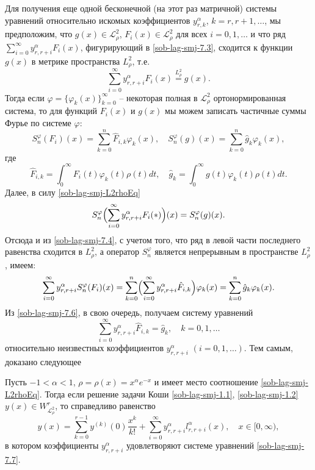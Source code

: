 Для получения еще одной бесконечной (на этот раз матричной) системы уравнений относительно искомых коэффициентов $y^\alpha_{r,k}$, $k=r,r+1,\ldots$, мы предположим, что $g(x)\in \mathcal{L}^2_\rho$, $F_i(x)\in \mathcal{L}^2_\rho$ для всех $i=0,1,\ldots$ и что ряд $\sum_{i=0}^\infty y^\alpha_{r,r+i}F_i(x)$, фигурирующий в \eqref{sob-lag-smj-7.3}, сходится к функции $g(x)$ в метрике пространства $L^2_\rho$, т.е.
\begin{equation}\label{sob-lag-smj-L2rhoEq}
\sum_{i=0}^\infty y^\alpha_{r,r+i}F_i(x) \stackrel{L^2_\rho}{=} g(x).
\end{equation}
Тогда если $\varphi = \{\varphi_k(x)\}_{k=0}^\infty$ -- некоторая полная в $\mathcal{L}^2_\rho$ ортонормированная система, то для функций $F_i(x)$ и $g(x)$ мы можем записать частичные суммы Фурье по системе $\varphi$:
\begin{equation}\label{sob-lag-smj-7.4}
S_n^\varphi(F_i)(x)= \sum_{k=0}^n\hat F_{i,k}\varphi_k(x), \quad
S_n^\varphi(g)(x)= \sum_{k=0}^n\hat g_{k}\varphi_k(x),
\end{equation}
где
$$
\hat F_{i,k}= \int_{0}^\infty F_{i}(t)\varphi_k(t)\rho(t)dt, \quad
\hat g_{k}= \int_{0}^\infty g(t)\varphi_k(t)\rho(t)dt.
$$
Далее, в силу \eqref{sob-lag-smj-L2rhoEq}
\begin{equation*}
S_n^\varphi
\Bigl(
    \sum_{i=0}^\infty y^\alpha_{r,r+i}F_i(*)
\Bigr)(x)
=S_n^\varphi(g)(x).
\end{equation*}
Отсюда и из \eqref{sob-lag-smj-7.4}, с учетом того, что ряд в левой части последнего равенства сходится в $L^2_\rho$, а оператор $S_n^\varphi$ является непрерывным в пространстве $L^2_\rho$, имеем:
\begin{equation}\label{sob-lag-smj-7.6}
\sum_{i=0}^\infty y^\alpha_{r,r+i}S_n^\varphi(F_i)(x)=
\sum_{k=0}^n \Bigl(\sum_{i=0}^\infty y^\alpha_{r,r+i}\hat F_{i,k}\Bigr)\varphi_k(x)=
\sum_{k=0}^n\hat g_{k}\varphi_k(x).
\end{equation}
Из \eqref{sob-lag-smj-7.6}, в свою очередь, получаем систему уравнений
\begin{equation}\label{sob-lag-smj-7.7}
\sum_{i=0}^\infty y^\alpha_{r,r+i}\hat F_{i,k}=\hat g_{k}, \quad k=0,1,\ldots
\end{equation}
относительно неизвестных коэффициентов $y^\alpha_{r,r+i}$ $(i=0, 1, \ldots)$.
Тем самым, доказано следующее
\begin{statement}
Пусть $-1<\alpha<1$, $\rho=\rho(x)=x^\alpha e^{-x}$ и имеет место соотношение \eqref{sob-lag-smj-L2rhoEq}. Тогда если решение задачи Коши \eqref{sob-lag-smj-1.1}, \eqref{sob-lag-smj-1.2} $y(x) \in W^{r}_{\mathcal{L}_{\rho}^2}$, то справедливо равенство
\begin{equation*}
y(x)= \sum_{k=0}^{r-1} y^{(k)}(0)\frac{x^k}{k!}+ \sum_{i=0}^\infty y_{r,r+i}^\alpha l_{r,r+i}^\alpha(x), \quad x \in [0,\infty),
\end{equation*}
в котором коэффициенты $y^\alpha_{r,r+i}$ удовлетворяют системе уравнений \eqref{sob-lag-smj-7.7}.
\end{statement}

